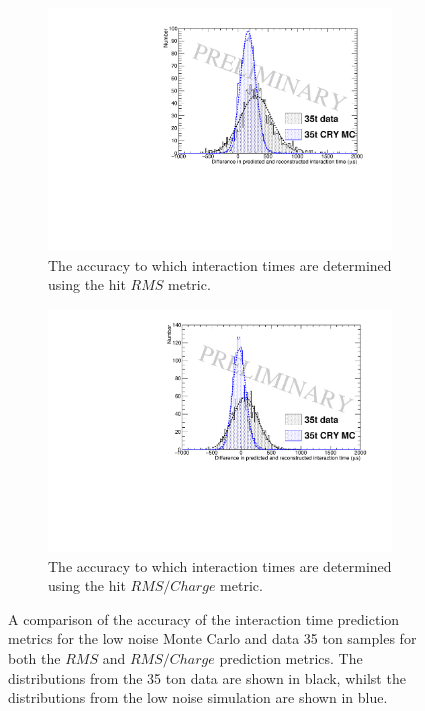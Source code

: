 \begin{figure}[h!]
  \centering
    \begin{subfigure}{0.45\textwidth}
    \centering
    \includegraphics[width=\textwidth]{PredictedTimeFromRMSFits}
    \caption{The accuracy to which interaction times are determined using the hit $RMS$ metric.}
    \label{fig:DiffMCDataResRMS}
  \end{subfigure}
  \hspace{0.08\textwidth}
  \begin{subfigure}{0.45\textwidth}
    \centering
    \includegraphics[width=\textwidth]{PredictedTimeFromRMS_IntFits}
    \caption{The accuracy to which interaction times are determined using the hit $RMS/Charge$ metric.}
    \label{fig:DiffMCDataResRMSQ}
  \end{subfigure}
  \caption[A comparison of the accuracy of the interaction time prediction metrics for the low noise Monte Carlo and data 35 ton samples]
          {A comparison of the accuracy of the interaction time prediction metrics for the low noise Monte Carlo and data 35 ton samples for both the $RMS$ and $RMS/Charge$ prediction metrics. The distributions from the 35 ton data are shown in black, whilst the distributions from the low noise simulation are shown in blue.}
          \label{fig:DiffMCDataRes}
\end{figure}

